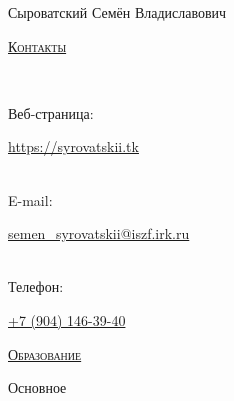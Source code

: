 \documentclass[10pt]{article}
\begin{document}
\begin{bf}\begin{LARGE}\begin{scshape}Сыроватский Семён Владиславович\end{scshape}\end{LARGE}\end{bf}

\vspace{2em}

\begin{bf}\begin{large}\uline{\scshape{Контакты}}\end{large}\end{bf}

\vspace{1em}

\begin{small}
\faDesktop~\begin{bf}Веб-страница:\end{bf} \href{https://syrovatskii.tk}{https://syrovatskii.tk} \\
\faEnvelopeO~\begin{bf}E-mail:\end{bf} \href{mailto:semen\_syrovatskii@iszf.irk.ru}{semen\_syrovatskii@iszf.irk.ru} \\
\faPhone~\begin{bf}Телефон:\end{bf} \href{tel:79041463940}{+7 (904) 146-39-40}    
\end{small}

\vspace{2em}

\begin{bf}\begin{large}\uline{\scshape{Образование}}\end{large}\end{bf}

\vspace{1em}

\begin{bf}\begin{large}Основное\end{large}\end{bf}

\vspace{1em}
\end{document}
